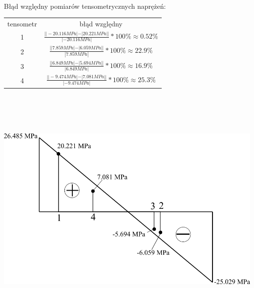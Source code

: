 \documentclass[11pt]{article}
\begin{document}
\\
Błąd względny pomiarów tensometrycznych naprężeń:\\
\begin{tabular}{cc}
tensometr & błąd względny\\
1 & $\frac{||-20.116 MPa|-|20.221 MPa||}{|-20.116 MPa|} * 100\% \approx 0.52\%$\\
2 & $\frac{||7.859 MPa|-|6.059 MPa||}{|7.859 MPa|} * 100\% \approx 22.9\%$\\
3 & $\frac{||6.849 MPa|-|5.694 MPa||}{|6.849 MPa|} * 100\% \approx 16.9\%$\\
4 & $\frac{||-9.474 MPa|-|7.081 MPa||}{|-9.474 MPa|} * 100\% \approx 25.3\%$\\
\end{tabular}\\
\\\\\\
\includegraphics{wykres_diff.png}
\end{document}
